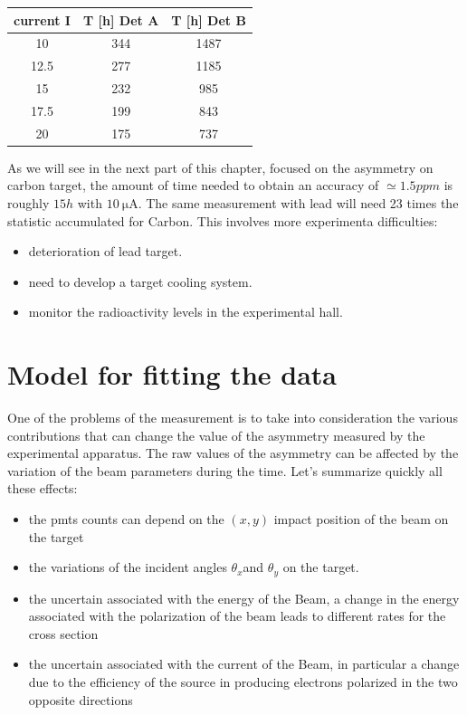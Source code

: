 \begin{table}[ht]
\centering
\begin{tabular}{c|c|c}
\hline
   current I &   T [h] Det A &   T [h] Det B \\
\hline
        10   &       344 &      1487  \\
        12.5 &       277 &      1185   \\
        15   &       232 &      985 \\
        17.5 &       199 &      843 \\
        20   &       175 &      737 \\
\hline
\end{tabular}
\end{table}

As we will see in the next part of this chapter, focused on the asymmetry on carbon target, the amount of time needed to obtain an accuracy of $\simeq 1.5 ppm$ is roughly $15 h$ with $\SI{10}{\micro \ampere}$. The same measurement with lead will need 23 times the statistic accumulated for Carbon. This involves more experimenta difficulties:

\begin{itemize}
\item deterioration of lead target.
\item need to develop a target cooling system.
\item monitor the radioactivity levels in the experimental hall.
\end{itemize}  
 
\section{Model for fitting the data}
\bigskip

One of the problems of the measurement is to take into consideration the various contributions that can change the value of the asymmetry measured by the experimental apparatus. The raw values of the asymmetry can be affected by the variation of the beam parameters during the time. Let's summarize quickly all these effects:
\begin{itemize}
\item the pmts counts  can depend on the $(x,y)$ impact position of the beam on the target
\item the variations of the incident angles $\theta_{x}$and $\theta_{y}$ on the target.
\item the uncertain associated with the energy of the Beam, a change in the energy associated with the polarization of the beam leads to different rates for the cross section
\item the uncertain associated with the current of the Beam, in particular a change due to the 
efficiency of the source in producing electrons polarized in the two opposite directions
\end{itemize}


